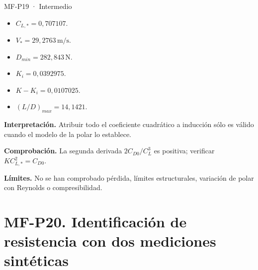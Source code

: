 \begin{studiumworked}{MF-P19 · Intermedio}
\begin{itemize}
\item $C_{L,*}=0{,}707107$.

\item $V_*=29{,}2763\,\mathrm{m/s}$.

\item $D_{min}=282{,}843\,\mathrm{N}$.

\item $K_i=0{,}0392975$.

\item $K-K_i=0{,}0107025$.

\item $(L/D)_{max}=14{,}1421$.

\end{itemize}

\textbf{Interpretación.} Atribuir todo el coeficiente cuadrático a inducción sólo es válido cuando el modelo de la polar lo establece.

\textbf{Comprobación.} La segunda derivada $2C_{D0}/C_L^3$ es positiva; verificar $KC_{L,*}^2=C_{D0}$.

\textbf{Límites.} No se han comprobado pérdida, límites estructurales, variación de polar con Reynolds o compresibilidad.

\end{studiumworked}



\Needspace{.30\textheight}\section{MF-P20. Identificación de resistencia con dos mediciones sintéticas}

